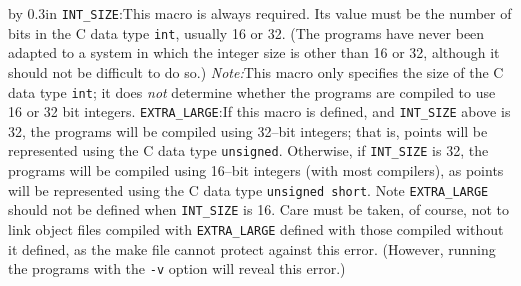\smallbreak
{\advance\leftskip by 0.3in\noindent
    {\tt INT\_SIZE}:\quad  This macro is always required.  Its value must
             be the number of bits in the C data type {\tt int}, usually
             16 or 32.  (The programs have never been adapted to a system
             in which the integer size is other than 16 or 32, although
             it should not be difficult to do so.)
             {\it Note:\/}\enskip This macro only specifies the size of the
             C data type {\tt int}; it does {\it not\/} determine whether
             the programs are compiled to use 16 or 32 bit integers.  
\smallbreak
   {\tt EXTRA\_LARGE}:\quad If this macro is defined, and {\tt INT\_SIZE}
             above is 32, the programs will be compiled using 32--bit integers;
             that is, points will be represented using the C data type
             {\tt unsigned}.  Otherwise, if {\tt INT\_SIZE} is 32, the programs
             will be compiled using 16--bit integers (with most compilers),
             as points will be represented using the C data type
             {\tt unsigned short}.  Note {\tt EXTRA\_LARGE} should not be
             defined when {\tt INT\_SIZE} is 16.  Care must be taken, of
             course, not to link object files compiled with {\tt EXTRA\_LARGE}
             defined with those compiled without it defined, as the make file
             cannot protect against this error.  (However, running the programs
             with the {\tt -v} option will reveal this error.)
         
}
